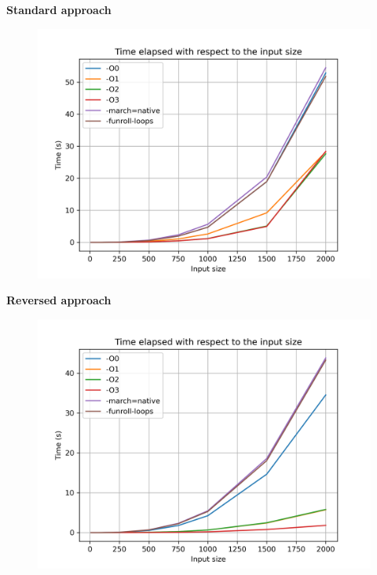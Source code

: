 \documentclass[10pt,externalviewer]{beamer}
\begin{document}
\begin{frame}
   \begin{minipage}{0.32\textwidth}
      \begin{center}
         \small{\textcolor{BrickRed}{\textbf{Standard approach}}}
      \end{center}
      \vspace{-0.5cm}
      \begin{figure}[H]
         \centering
         \includegraphics[width=\textwidth]{Immagini/plot_t_sum_standard.png}
      \end{figure}
   \end{minipage}
   \hfill
   \begin{minipage}{0.32\textwidth}
      \begin{center}
         \small{\textcolor{BrickRed}{\textbf{Reversed approach}}}
      \end{center}
      \vspace{-0.5cm}
      \begin{figure}[H]
         \centering
         \includegraphics[width=\textwidth]{Immagini/plot_t_sum_reversed.png}

\end{figure}
\end{minipage}
\end{frame}
\end{document}
